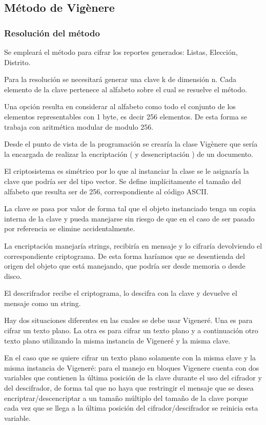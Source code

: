 \documentclass[a4paper,10pt]{article}
\begin{document}
\subsection{Método de Vigènere}

\subsubsection{Resolución del método}

Se empleará el método para cifrar los reportes generados: Listas, Elección, Distrito.

Para la resolución se necesitará generar una clave k de dimensión n. Cada elemento de la clave pertenece al alfabeto sobre el cual se resuelve el método.

Una opción resulta en considerar al alfabeto como todo el conjunto de los elementos representables con 1 byte, es decir 256 elementos. De esta forma se trabaja con aritmética modular de modulo 256.

Desde el punto de vista de la programación se crearía la clase Vigènere que sería la encargada de realizar la encriptación ( y desencriptación ) de un documento.

El criptosistema es simétrico por lo que al instanciar la clase se le asignaría la clave que podría ser del tipo vector. Se define implícitamente el tamaño del alfabeto que resulta ser de 256, correspondiente al código ASCII.

La clave se pasa por valor de forma tal que el objeto instanciado tenga un copia interna de la clave y pueda manejarse sin riesgo de que en el caso de ser pasado por referencia se elimine accidentalmente.

La encriptación manejaría strings, recibiría en mensaje y lo cifraría devolviendo el correspondiente criptograma. De esta forma haríamos que se desentienda del origen del objeto que está manejando, que podría ser desde memoria o desde disco.

El descrifrador recibe el criptograma, lo descifra con la clave y devuelve el mensaje como un string.

Hay dos situaciones diferentes en las cuales se debe usar Vigeneré. Una es para cifrar un texto plano. La otra es para cifrar un texto plano y a continuación otro texto plano utilizando la misma instancia de Vigeneré y la misma clave.

En el caso que se quiere cifrar un texto plano solamente con la misma clave y la misma instancia de Vigeneré: para el manejo en bloques Vigenere cuenta con dos variables que contienen la última posición de la clave durante el uso del cifrador y del descifrador, de forma tal que no haya que restringir el mensaje que se desea encriptrar/descencriptar a un tamaño múltiplo del tamaño de la clave porque cada vez que se llega a la última posición del cifrador/descifrador se reinicia esta variable.
\end{document}
